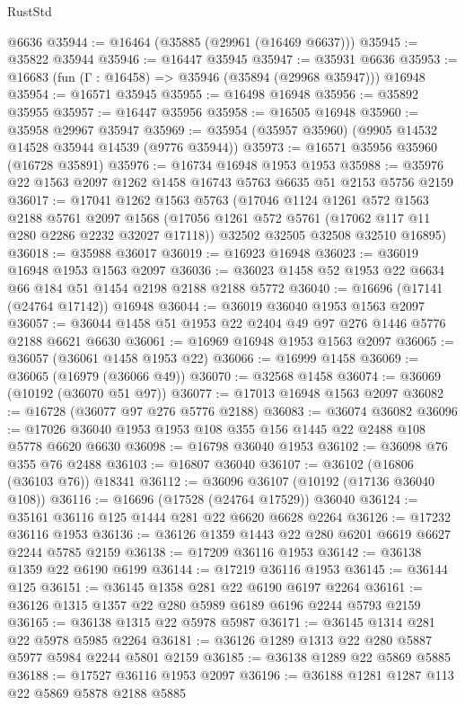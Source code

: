 \begin{lexlean}{RustStd}
\begin{coremodule}
    @6636
@35944 := @16464 (@35885 (@29961 (@16469 @6637)))
@35945 := @35822 @35944
@35946 := @16447 @35945
@35947 := @35931 @6636
@35953 := @16683 (fun (Γ : @16458) => @35946 (@35894 (@29968 @35947))) @16948
@35954 := @16571 @35945
@35955 := @16498 @16948
@35956 := @35892 @35955
@35957 := @16447 @35956
@35958 := @16505 @16948
@35960 := @35958 @29967 @35947
@35969 := @35954 (@35957 @35960) (@9905 @14532 @14528 @35944 @14539 (@9776 @35944))
@35973 := @16571 @35956 @35960 (@16728 @35891)
@35976 := @16734 @16948 @1953 @1953
@35988 := @35976 @22 @1563 @2097 @1262 @1458 @16743 @5763 @6635 @51 @2153 @5756 @2159
@36017 := @17041
    @1262
    @1563
    @5763
    (@17046
      @1124
      @1261
      @572
      @1563
      @2188
      @5761
      @2097
      @1568
      (@17056 @1261 @572 @5761 (@17062 @117 @11 @280 @2286 @2232 @32027 @17118))
      @32502
      @32505
      @32508
      @32510
      @16895)
@36018 := @35988 @36017
@36019 := @16923 @16948
@36023 := @36019 @16948 @1953 @1563 @2097
@36036 := @36023 @1458 @52 @1953 @22 @6634 @66 @184 @51 @1454 @2198 @2188 @2188 @5772
@36040 := @16696 (@17141 (@24764 @17142)) @16948
@36044 := @36019 @36040 @1953 @1563 @2097
@36057 := @36044 @1458 @51 @1953 @22 @2404 @49 @97 @276 @1446 @5776 @2188 @6621 @6630
@36061 := @16969 @16948 @1953 @1563 @2097
@36065 := @36057 (@36061 @1458 @1953 @22)
@36066 := @16999 @1458
@36069 := @36065 (@16979 (@36066 @49))
@36070 := @32568 @1458
@36074 := @36069 (@10192 (@36070 @51 @97))
@36077 := @17013 @16948 @1563 @2097
@36082 := @16728 (@36077 @97 @276 @5776 @2188)
@36083 := @36074 @36082
@36096 := @17026 @36040 @1953 @1953 @108 @355 @156 @1445 @22 @2488 @108 @5778 @6620 @6630
@36098 := @16798 @36040 @1953
@36102 := @36098 @76 @355 @76 @2488
@36103 := @16807 @36040
@36107 := @36102 (@16806 (@36103 @76)) @18341
@36112 := @36096 @36107 (@10192 (@17136 @36040 @108))
@36116 := @16696 (@17528 (@24764 @17529)) @36040
@36124 := @35161 @36116 @125 @1444 @281 @22 @6620 @6628 @2264
@36126 := @17232 @36116 @1953
@36136 := @36126 @1359 @1443 @22 @280 @6201 @6619 @6627 @2244 @5785 @2159
@36138 := @17209 @36116 @1953
@36142 := @36138 @1359 @22 @6190 @6199
@36144 := @17219 @36116 @1953
@36145 := @36144 @125
@36151 := @36145 @1358 @281 @22 @6190 @6197 @2264
@36161 := @36126 @1315 @1357 @22 @280 @5989 @6189 @6196 @2244 @5793 @2159
@36165 := @36138 @1315 @22 @5978 @5987
@36171 := @36145 @1314 @281 @22 @5978 @5985 @2264
@36181 := @36126 @1289 @1313 @22 @280 @5887 @5977 @5984 @2244 @5801 @2159
@36185 := @36138 @1289 @22 @5869 @5885
@36188 := @17527 @36116 @1953 @2097
@36196 := @36188 @1281 @1287 @113 @22 @5869 @5878 @2188 @5885

\end{coremodule}
\end{lexlean}
